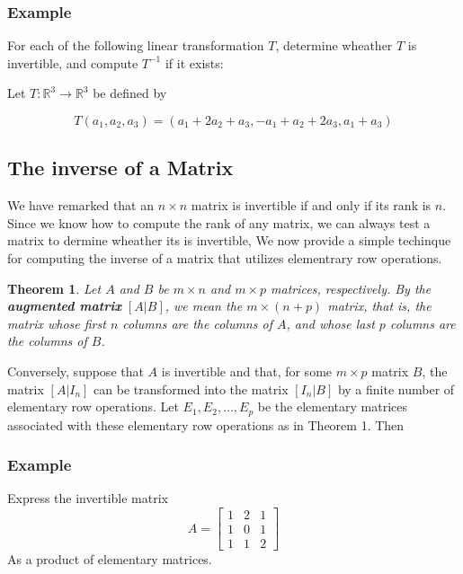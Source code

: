 \documentclass[10pt, oneside]{article}
\newcommand{\R}{\mathbb{R}}
\newtheorem{thm}{Theorem}
\begin{document}
\subsubsection{Example}
For each of the following linear transformation $T$, determine wheather $T$ is invertible, and compute $T^{-1}$ if it exists:

Let $T: \R^3 \to \R^3$ be defined by

\[
	T(a_1, a_2, a_3) = (a_1 + 2a_2 + a_3, -a_1 + a_2 + 2a_3, a_1 + a_3)
\]


\subsection{The inverse of a Matrix}
We have remarked that an $n \times n$ matrix is invertible if and only if its rank is $n$. Since we know how to compute the rank of any matrix, we can always test a matrix
to dermine wheather its is invertible, We now provide a simple techinque for computing the inverse of a matrix that utilizes elementrary row operations.

\begin{thm}
	Let $A$ and $B$ be $m \times n$ and $m \times p$ matrices, respectively. By the \textbf{augmented matrix} $[A|B]$, we mean the $m \times (n + p)$ matrix, that is, the matrix whose first $n$ columns are
	the columns of $A$, and whose last $p$ columns are the columns of $B$.
\end{thm}

Conversely, suppose that $A$ is invertible and that, for some $m \times p$ matrix $B$, the matrix $[A|I_n]$ can be transformed into the matrix $[I_n|B]$ by a finite number of elementary row operations.
Let $E_1, E_2, \ldots, E_p$ be the elementary matrices associated with these elementary row operations as in Theorem 1. Then


\subsubsection{Example}
Express the invertible matrix
\[
	A = \begin{bmatrix} 1 & 2 & 1 \\ 1 & 0 & 1 \\ 1 & 1 & 2 \end{bmatrix}
\]
As a product of elementary matrices.
\end{document}
